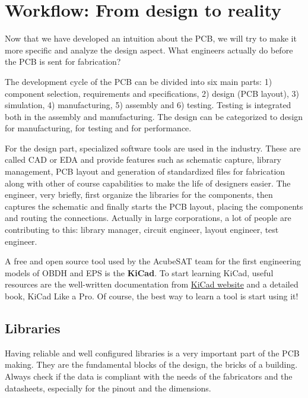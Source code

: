 \documentclass[final]{cubedoc}
\begin{document}
	\section{Workflow: From design to reality} 
	
	Now that we have developed an intuition about the PCB, we will try to make it more specific and analyze the design aspect. What engineers actually do before the PCB is sent for fabrication?
	
	The development cycle of the PCB can be divided into six main parts: 1) component selection, requirements and specifications, 2) design (PCB layout), 3) simulation, 4) manufacturing, 5) assembly and 6) testing. Testing is integrated both in the assembly and manufacturing.
	The design can be categorized to design for manufacturing, for testing and for performance.  
	
	For the design part, specialized software tools are used in the industry. These are called CAD or EDA and provide features such as schematic capture, library management, PCB layout and generation of standardized files for fabrication along with other of course capabilities to make the life of designers easier. The engineer, very briefly, first organize the libraries for the components, then captures the schematic and finally starts the PCB layout, placing the components and routing the connections. Actually in large corporations, a lot of people are contributing to this: library manager, circuit engineer, layout engineer, test engineer.
	
	A free and open source tool used by the AcubeSAT team for the first engineering models of OBDH and EPS is the \textbf{KiCad}. To start learning KiCad, useful resources are the well-written documentation from \href{http://docs.kicad-pcb.org/}{KiCad website} and a detailed book, KiCad Like a Pro. Of course, the best way to learn a tool is start using it!
	
	\subsection{Libraries}
	
	Having reliable and well configured libraries is a very important part of the PCB making. They are the fundamental blocks of the design, the bricks of a building. Always check if the data is compliant with the needs of the fabricators and the datasheets, especially for the pinout and the dimensions.
	
\end{document}
